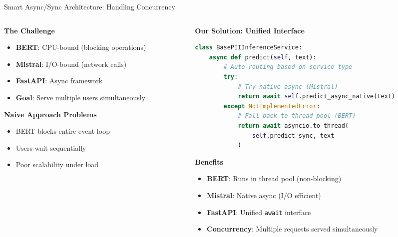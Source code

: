 \documentclass[aspectratio=169]{beamer}
\begin{document}
\begin{frame}{Smart Async/Sync Architecture: Handling Concurrency}
\begin{columns}
\begin{column}{0.5\textwidth}
\textbf{The Challenge}
\begin{itemize}
\item \textbf{BERT}: CPU-bound (blocking operations)
\item \textbf{Mistral}: I/O-bound (network calls)
\item \textbf{FastAPI}: Async framework
\item \textbf{Goal}: Serve multiple users simultaneously
\end{itemize}

\vspace{0.3cm}
\textbf{Naive Approach Problems}
\begin{itemize}
\item BERT blocks entire event loop
\item Users wait sequentially
\item Poor scalability under load
\end{itemize}
\end{column}
\begin{column}{0.5\textwidth}
\textbf{Our Solution: Unified Interface}
\begin{lstlisting}[language=python,basicstyle=\tiny]
class BasePIIInferenceService:
    async def predict(self, text):
        # Auto-routing based on service type
        try:
            # Try native async (Mistral)
            return await self.predict_async_native(text)
        except NotImplementedError:
            # Fall back to thread pool (BERT)
            return await asyncio.to_thread(
                self.predict_sync, text
            )
\end{lstlisting}

\vspace{0.3cm}
\textbf{Benefits}
\begin{itemize}
\item \textbf{BERT}: Runs in thread pool (non-blocking)
\item \textbf{Mistral}: Native async (I/O efficient)
\item \textbf{FastAPI}: Unified \texttt{await} interface
\item \textbf{Concurrency}: Multiple requests served simultaneously
\end{itemize}
\end{column}
\end{columns}
\end{frame}
\end{document}
